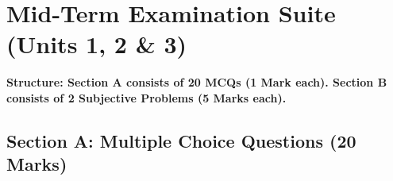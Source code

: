 \section{Mid-Term Examination Suite (Units 1, 2 \& 3)}

\begin{center}
\sffamily\textbf{\color{AlertRed}Structure: Section A consists of 20 MCQs (1 Mark each). Section B consists of 2 Subjective Problems (5 Marks each).}
\end{center}

\subsection*{Section A: Multiple Choice Questions (20 Marks)}

